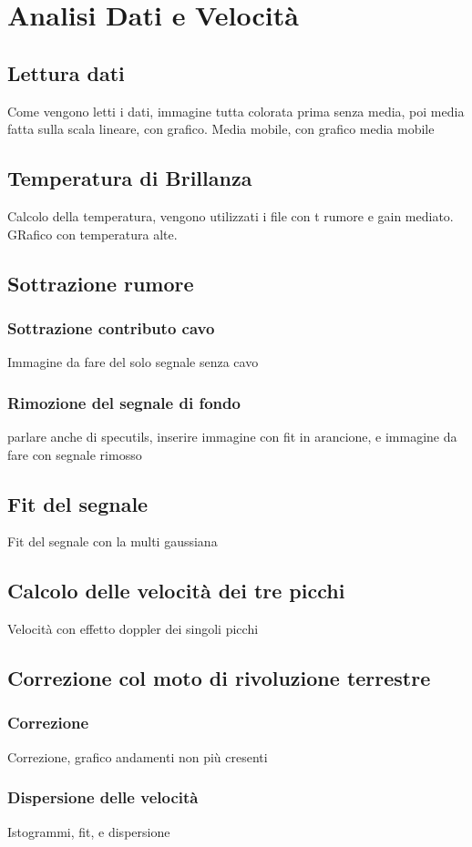 \section{Analisi Dati e Velocità}
\label{Analisi Dati e Velocità}



\subsection{Lettura dati}
Come vengono letti i dati, immagine tutta colorata prima senza media, poi media fatta sulla scala lineare, con grafico. 
Media mobile, con grafico media mobile


\subsection{Temperatura di Brillanza}
Calcolo della temperatura, vengono utilizzati i file con t rumore e gain mediato. GRafico con temperatura alte. 

\subsection{Sottrazione rumore}

\subsubsection{Sottrazione contributo cavo}
Immagine da fare del solo segnale senza cavo




\subsubsection{Rimozione del segnale di fondo}
parlare anche di specutils, inserire immagine con fit in arancione, e immagine da fare con segnale rimosso


\subsection{Fit del segnale}
Fit del segnale con la multi gaussiana

\subsection{Calcolo delle velocità dei tre picchi}
Velocità con effetto doppler dei singoli picchi

\subsection{Correzione col moto di rivoluzione terrestre}

\subsubsection{Correzione}
Correzione, grafico andamenti non più cresenti 


\subsubsection{Dispersione delle velocità}
Istogrammi, fit, e dispersione